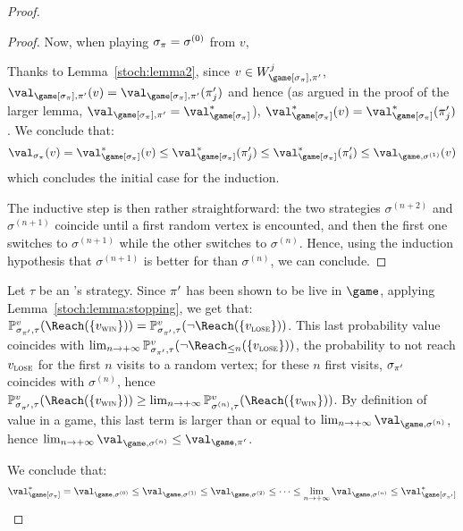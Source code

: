 \begin{proof}
\begin{proof}
    Now, when playing $\sigma_\pi = \sigma^{(0)}$ from $v$, 

    Thanks to Lemma~\ref{stoch:lemma2}, since $v \in
    W_{\game[\sigma_\perm],\perm'}^j$,
    $\val_{\game[\sigma_\perm],\perm'}(v) =
    \val_{\game[\sigma_\perm],\perm'}(\perm'_j)$ and hence (as argued
    in the proof of the larger lemma,
    $\val_{\game[\sigma_\perm],\perm'} =
    \val^*_{\game[\sigma_\perm]}$), $\val^*_{\game[\sigma_\perm]}(v) =
    \val^*_{\game[\sigma_\perm]}(\perm'_j)$. We conclude that:
    \[
    \val_{\sigma_\perm}(v) = \val^*_{\game[\sigma_\perm]}(v) \le
    \val^*_{\game[\sigma_\perm]}(\perm'_j) \le
    \val^*_{\game[\sigma_\perm]}(\perm'_i) \le
    \val_{\game,\sigma^{(1)}}(v)
    \]
    which concludes the initial case for the induction.

    \smallskip The inductive step is then rather straightforward: the
    two strategies $\sigma^{(n+2)}$ and $\sigma^{(n+1)}$ coincide
    until a first random vertex is encounted, and then the first one
    switches to $\sigma^{(n+1)}$ while the other switches to
    $\sigma^{(n)}$. Hence, using the induction hypothesis that
    $\sigma^{(n+1)}$ is better for \Eve than $\sigma^{(n)}$, we can
    conclude.
  \end{proof}

  Let $\tau$ be an \Adam's strategy. Since $\pi'$ has been shown to
  be live in $\game$, applying Lemma~\ref{stoch:lemma:stopping}, we
  get that: $\probm^v_{\sigma_{\perm'},\tau} (\Reach(\{\vwin\})) =
  \probm^v_{\sigma_{\perm'},\tau} (\neg\Reach(\{\vlose\}))$. This last
  probability value coincides with $\lim_{n \to +\infty}
  \probm^v_{\sigma_{\perm'},\tau} (\neg\Reach_{\le n}(\{\vlose\}))$,
  the probability to not reach $v_{\textsc{lose}}$ for the first $n$ visits to a
  random vertex; for these $n$ first visits, $\sigma_{\pi'}$
  coincides with $\sigma^{(n)}$, hence
  $\probm^v_{\sigma_{\perm'},\tau} (\Reach(\{\vwin\})) \ge \lim_{n\to
    +\infty} \probm^v_{\sigma^{(n)},\tau} (\Reach(\{\vwin\}))$. By
  definition of value in a game, this last term is larger than or
  equal to $\lim_{n \to+\infty}\val_{\game,\sigma^{(n)}}$, hence
  $\lim_{n \to+\infty}\val_{\game,\sigma^{(n)}} \le
  \val_{\game,\perm'}$.

  We conclude that:
  \[
  \val^*_{\game[\sigma_\perm]} = \val_{\game,\sigma^{(0)}} \le
  \val_{\game,\sigma^{(1)}} \le \val_{\game,\sigma^{(2)}} \le \dots\le
  \lim_{n \to +\infty} \val_{\game,\sigma^{(n)}} \le
  \val^*_{\game[\sigma_{\perm'}]}
  \]


\end{proof}

